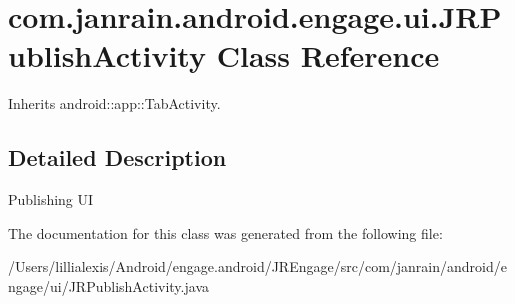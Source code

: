 \hypertarget{classcom_1_1janrain_1_1android_1_1engage_1_1ui_1_1_j_r_publish_activity}{
\section{com.janrain.android.engage.ui.JRPublishActivity Class Reference}
\label{classcom_1_1janrain_1_1android_1_1engage_1_1ui_1_1_j_r_publish_activity}
}


Inherits android::app::TabActivity.



\subsection{Detailed Description}
Publishing UI 

The documentation for this class was generated from the following file:\begin{DoxyCompactItemize}
\item 
/Users/lillialexis/Android/engage.android/JREngage/src/com/janrain/android/engage/ui/JRPublishActivity.java\end{DoxyCompactItemize}
